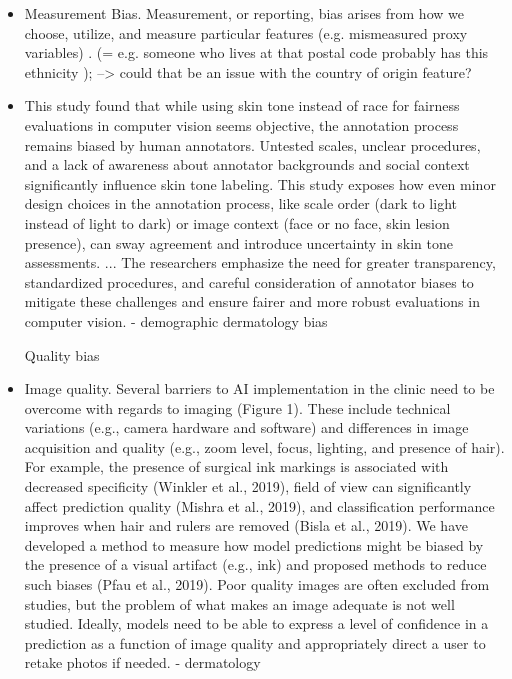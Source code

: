 \documentclass[12pt, a4paper, oneside]{book}   	%
\newcommand{\rawcitationusedstart}{\color{violet}}
\begin{document}
			\begin{itemize}		
				\rawcitationusedstart
				\item Measurement Bias. Measurement, or reporting, bias arises from how we choose, utilize, and measure particular features \autocite{M144_Suresh_2021} (e.g. mismeasured proxy variables) \autocite{Mehrabi_2021}. (= e.g. someone who lives at that postal code probably has this ethnicity ); --> could that be an issue with the country of origin feature?
				\item This study found that while using skin tone instead of race for fairness evaluations in computer vision seems objective, the annotation process remains biased by human annotators. Untested scales, unclear procedures, and a lack of awareness about annotator backgrounds and social context significantly influence skin tone labeling. This study exposes how even minor design choices in the annotation process, like scale order (dark to light instead of light to dark) or image context (face or no face, skin lesion presence), can sway agreement and introduce uncertainty in skin tone assessments. ... The researchers emphasize the need for greater transparency, standardized procedures, and careful consideration of annotator biases to mitigate these challenges and ensure fairer and more robust evaluations in computer vision. \autocite{Montoya_2025} - demographic dermatology bias
				
				Quality bias
				\item Image quality. Several barriers to AI implementation in the clinic need to be overcome with regards to imaging (Figure 1). These include technical variations (e.g., camera hardware and software) and differences in image acquisition and quality (e.g., zoom level, focus, lighting, and presence of hair). For example, the presence of surgical ink markings is associated with decreased specificity (Winkler et al., 2019), field of view can significantly affect prediction quality (Mishra et al., 2019), and classification performance improves when hair and rulers are removed (Bisla et al., 2019). We have developed a method to measure how model predictions might be biased by the presence of a visual artifact (e.g., ink) and proposed methods to reduce such biases (Pfau et al., 2019). Poor quality images are often excluded from studies, but the problem of what makes an image adequate is not well studied. Ideally, models need to be able to express a level of confidence in a prediction as a function of image quality and appropriately direct a user to retake photos if needed. \autocite{Young_2020} - dermatology
				

\end{itemize}
\end{document}
